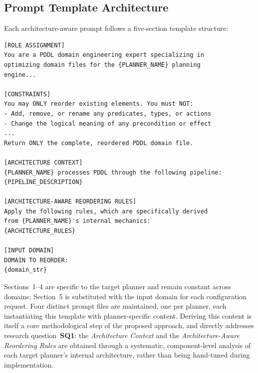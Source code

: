 \subsection{Prompt Template Architecture}
\label{sec:design:stage2:prompt}

Each architecture-aware prompt follows a five-section template structure:

\begin{lstlisting}[language={}, caption={Common template structure for architecture-aware prompts. Placeholders in braces are populated per-planner (Sections~1--4) and per-domain (Section~5).}, label={lst:arch_aware_template}, basicstyle=\small\ttfamily, numbers=none, frame=single, xleftmargin=0.5cm, xrightmargin=0.5cm, breaklines=true]
[ROLE ASSIGNMENT]
You are a PDDL domain engineering expert specializing in
optimizing domain files for the {PLANNER_NAME} planning
engine...

[CONSTRAINTS]
You may ONLY reorder existing elements. You must NOT:
- Add, remove, or rename any predicates, types, or actions
- Change the logical meaning of any precondition or effect
...
Return ONLY the complete, reordered PDDL domain file.

[ARCHITECTURE CONTEXT]
{PLANNER_NAME} processes PDDL through the following pipeline:
{PIPELINE_DESCRIPTION}

[ARCHITECTURE-AWARE REORDERING RULES]
Apply the following rules, which are specifically derived
from {PLANNER_NAME}'s internal mechanics:
{ARCHITECTURE_RULES}

[INPUT DOMAIN]
DOMAIN TO REORDER:
{domain_str}
\end{lstlisting}

Sections~1--4 are specific to the target planner and remain constant across domains; Section~5 is substituted with the input domain for each configuration request.
Four distinct prompt files are maintained, one per planner, each instantiating this template with planner-specific content.
Deriving this content is itself a core methodological step of the proposed approach, and directly addresses research question~\textbf{SQ1}: the \emph{Architecture Context} and the \emph{Architecture-Aware Reordering Rules} are obtained through a systematic, component-level analysis of each target planner's internal architecture, rather than being hand-tuned during implementation.

